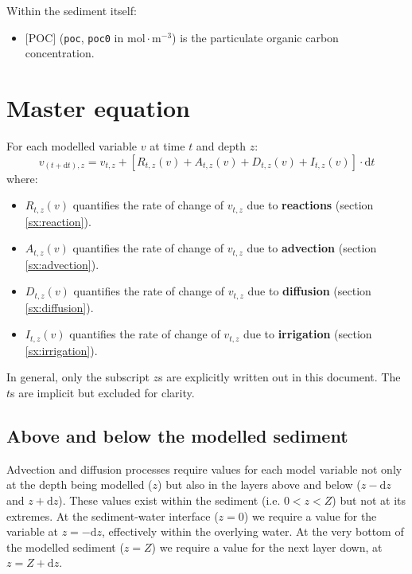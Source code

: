 \documentclass[a4paper]{article}
\newcommand{\D}[1]{\mathrm{d}#1}
\newcommand{\code}[1]{\texttt{#1}}
\newcommand{\molmmm}{\mathrm{mol}\cdot\mathrm{m}^{-3}}
\begin{document}
Within the sediment itself:
\begin{itemize}
  \item $[$POC$]$ (\code{poc}, \code{poc0} in $\molmmm$) is the particulate organic carbon concentration.
\end{itemize}



\section{Master equation}

For each modelled variable $v$ at time $t$ and depth $z$:
\begin{equation}
v_{(t+\D{t}), z} = v_{t,z} + [R_{t,z}(v) + A_{t,z}(v) + D_{t,z}(v) + I_{t,z}(v)] \cdot \D{t}
\end{equation}
where:
\begin{itemize}
  \item $R_{t,z}(v)$ quantifies the rate of change of $v_{t,z}$ due to \textbf{reactions} (section \ref{sx:reaction}).
  \item $A_{t,z}(v)$ quantifies the rate of change of $v_{t,z}$ due to \textbf{advection} (section \ref{sx:advection}).
  \item $D_{t,z}(v)$ quantifies the rate of change of $v_{t,z}$ due to \textbf{diffusion} (section \ref{sx:diffusion}).
  \item $I_{t,z}(v)$ quantifies the rate of change of $v_{t,z}$ due to \textbf{irrigation} (section \ref{sx:irrigation}).
\end{itemize}
In general, only the subscript $z$s are explicitly written out in this document.  The $t$s are implicit but excluded for clarity.


\subsection{Above and below the modelled sediment}

Advection and diffusion processes require values for each model variable not only at the depth being modelled ($z$) but also in the layers above and below ($z - \D{z}$ and $z + \D{z}$).  These values exist within the sediment (i.e. $0 < z < Z$) but not at its extremes.  At the sediment-water interface ($z = 0$) we require a value for the variable at $z = -\D{z}$, effectively within the overlying water.  At the very bottom of the modelled sediment ($z = Z$) we require a value for the next layer down, at $z = Z + \D{z}$.
\end{document}
